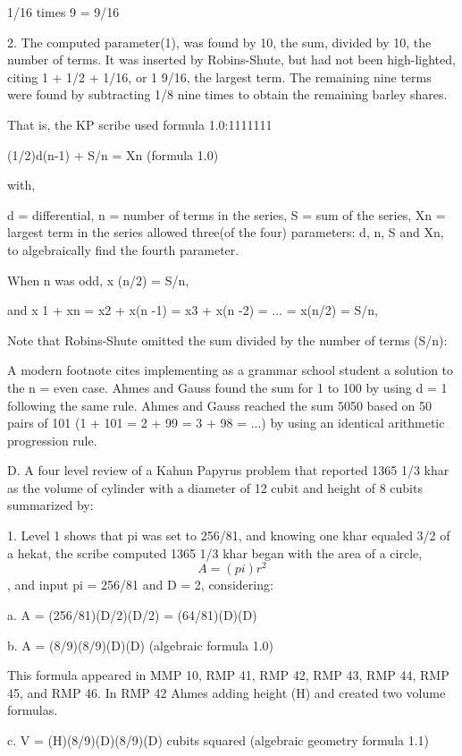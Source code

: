 \documentclass[12pt]{article}
\begin{document}
    1/16 times 9 = 9/16

2. The computed parameter(1), was found by 10, the sum, divided by 10, the number of terms. It was inserted by Robins-Shute, but had not been high-lighted, citing 1 + 1/2 + 1/16, or 1 9/16, the largest term. The remaining nine terms were found by subtracting 1/8 nine times to obtain the remaining barley shares.

That is, the KP scribe used formula 1.0:1111111

(1/2)d(n-1) + S/n = Xn (formula 1.0)

with,

d = differential, n = number of terms in the series, S = sum of the series, Xn = largest term in the series allowed three(of the four) parameters: d, n, S and Xn, to algebraically find the fourth parameter. 

When n was odd, x (n/2) = S/n, 

and x 1 + xn = x2 + x(n -1) = x3 + x(n -2) = ... = x(n/2) = S/n, 

Note that Robins-Shute omitted the sum divided by the number of terms (S/n):

A modern footnote cites  implementing as a grammar school student a solution to the n = even case. Ahmes and Gauss found the sum for 1 to 100 by using d = 1 following the same rule. Ahmes and Gauss reached the sum 5050 based on 50 pairs of 101 (1 + 101 = 2 + 99 = 3 + 98 = ...) by using an identical arithmetic progression rule.

D. A four level review of a Kahun Papyrus problem that reported 1365 1/3 khar as the volume of cylinder with a diameter of 12 cubit and height of 8 cubits summarized by:

1. Level 1 shows that pi was set to 256/81, and knowing one khar equaled 3/2 of a hekat, the scribe computed 1365 1/3 khar began with the area of a circle, $$A = (pi)r^2$$, and input pi = 256/81 and D = 2, considering:

a. A = (256/81)(D/2)(D/2) = (64/81)(D)(D)

b. A = (8/9)(8/9)(D)(D)   (algebraic formula 1.0)

This formula appeared in MMP 10, RMP 41, RMP 42, RMP 43, RMP 44, RMP 45, and RMP 46. In RMP 42 Ahmes adding height (H) and created two volume formulas.

c. V = (H)(8/9)(D)(8/9)(D) cubits squared  (algebraic geometry formula 1.1)
\end{document}
